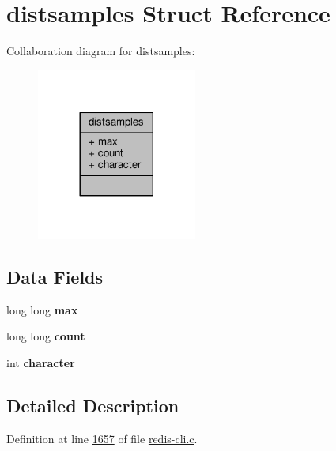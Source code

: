 \hypertarget{structdistsamples}{}\section{distsamples Struct Reference}
\label{structdistsamples}


Collaboration diagram for distsamples\+:\nopagebreak
\begin{figure}[H]
\begin{center}
\leavevmode
\includegraphics[width=149pt]{structdistsamples__coll__graph}
\end{center}
\end{figure}
\subsection*{Data Fields}
\begin{DoxyCompactItemize}
\item 
\mbox{\label{structdistsamples_a42cb229a35440667716cbe5dd5da4f0e}} 
long long {\bfseries max}
\item 
\mbox{\label{structdistsamples_a7c254d479072c13b847895fbc2e16c23}} 
long long {\bfseries count}
\item 
\mbox{\label{structdistsamples_a8cc486cc09fcdb634ea9480b57958ca0}} 
int {\bfseries character}
\end{DoxyCompactItemize}


\subsection{Detailed Description}


Definition at line \hyperlink{redis-cli_8c_source_l01657}{1657} of file \hyperlink{redis-cli_8c_source}{redis-\/cli.\+c}.



